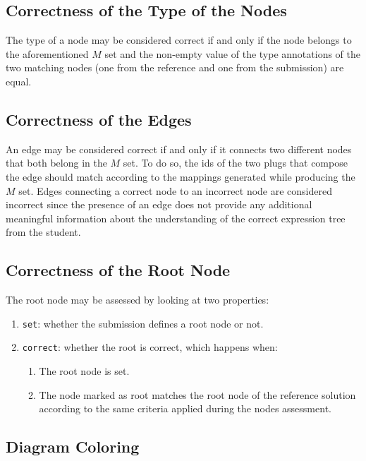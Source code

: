 \begin{chapterBody}
\subsection{Correctness of the Type of the Nodes}\label{sec:fb-assess-types}

The type of a node may be considered correct if and only if the node belongs
to the aforementioned $ M $ set and the non-empty value of the type annotations
of the two matching nodes (one from the reference and one from the submission)
are equal.

\subsection{Correctness of the Edges}\label{sec:fb-assess-edges}

An edge may be considered correct if and only if it connects two different
nodes that both belong in the $ M $ set. To do so, the ids of the two
plugs that compose the edge should match according to the mappings generated
while producing the $ M $ set.
Edges connecting a correct node to an incorrect node are considered
incorrect since the presence of an edge does not provide any additional
meaningful information about the understanding of the correct expression
tree from the student.

\subsection{Correctness of the Root Node}\label{sec:fb-assess-root}

The root node may be assessed by looking at two properties:

\begin{enumerate}
    \item \texttt{set}: whether the submission defines a root node or not.
    \item \texttt{correct}: whether the root is correct, which happens when:
    \begin{enumerate}
        \item The root node is set.
        \item The node marked as root matches the root node of the 
reference solution according to the same criteria applied during the nodes 
assessment.
    \end{enumerate}
\end{enumerate}

\subsection{Diagram Coloring}\label{sec:fb-assess-color}


\end{chapterBody}
